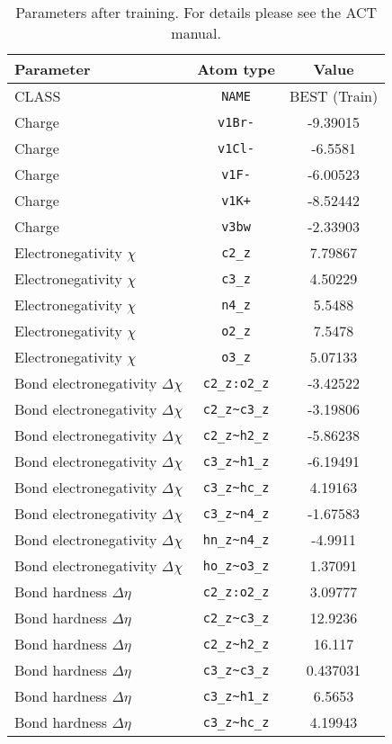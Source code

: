 \begin{table}[ht]
\caption{Parameters after training. For details please see the ACT manual.}
\begin{tabular}{lcc}
\hline
Parameter & Atom type & Value \\ 
\hline
CLASS & \verb^NAME^ & BEST (Train) \\ 
Charge & \verb^v1Br-^ & -9.39015 \\ 
Charge & \verb^v1Cl-^ & -6.5581 \\ 
Charge & \verb^v1F-^ & -6.00523 \\ 
Charge & \verb^v1K+^ & -8.52442 \\ 
Charge & \verb^v3bw^ & -2.33903 \\ 
Electronegativity $\chi$ & \verb^c2_z^ & 7.79867 \\ 
Electronegativity $\chi$ & \verb^c3_z^ & 4.50229 \\ 
Electronegativity $\chi$ & \verb^n4_z^ & 5.5488 \\ 
Electronegativity $\chi$ & \verb^o2_z^ & 7.5478 \\ 
Electronegativity $\chi$ & \verb^o3_z^ & 5.07133 \\ 
Bond electronegativity $\Delta\chi$ & \verb^c2_z:o2_z^ & -3.42522 \\ 
Bond electronegativity $\Delta\chi$ & \verb^c2_z~c3_z^ & -3.19806 \\ 
Bond electronegativity $\Delta\chi$ & \verb^c2_z~h2_z^ & -5.86238 \\ 
Bond electronegativity $\Delta\chi$ & \verb^c3_z~h1_z^ & -6.19491 \\ 
Bond electronegativity $\Delta\chi$ & \verb^c3_z~hc_z^ & 4.19163 \\ 
Bond electronegativity $\Delta\chi$ & \verb^c3_z~n4_z^ & -1.67583 \\ 
Bond electronegativity $\Delta\chi$ & \verb^hn_z~n4_z^ & -4.9911 \\ 
Bond electronegativity $\Delta\chi$ & \verb^ho_z~o3_z^ & 1.37091 \\ 
Bond hardness $\Delta\eta$ & \verb^c2_z:o2_z^ & 3.09777 \\ 
Bond hardness $\Delta\eta$ & \verb^c2_z~c3_z^ & 12.9236 \\ 
Bond hardness $\Delta\eta$ & \verb^c2_z~h2_z^ & 16.117 \\ 
Bond hardness $\Delta\eta$ & \verb^c3_z~c3_z^ & 0.437031 \\ 
Bond hardness $\Delta\eta$ & \verb^c3_z~h1_z^ & 6.5653 \\ 
Bond hardness $\Delta\eta$ & \verb^c3_z~hc_z^ & 4.19943 \\ 

\end{tabular}
\end{table}
